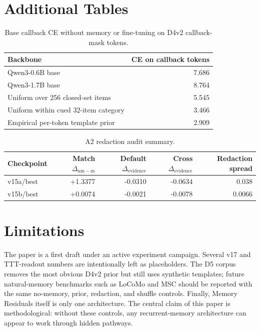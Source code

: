 \documentclass{article}
\newcommand{\dnm}{\Delta_{\mathrm{nm-m}}}
\newcommand{\elift}{\Delta_{\mathrm{evidence}}}
\begin{document}
\section{Additional Tables}

\begin{table}[h]
\centering
\caption{Base callback CE without memory or fine-tuning on D4v2
callback-mask tokens.}
\label{tab:base_ce}
\small
\begin{tabular}{lr}
\toprule
Backbone & CE on callback tokens \\
\midrule
Qwen3-0.6B base & 7.686 \\
Qwen3-1.7B base & 8.764 \\
Uniform over 256 closed-set items & 5.545 \\
Uniform within cued 32-item category & 3.466 \\
Empirical per-token template prior & 2.909 \\
\bottomrule
\end{tabular}
\end{table}

\begin{table}[h]
\centering
\caption{A2 redaction audit summary.}
\label{tab:redaction_summary}
\small
\begin{tabular}{lrrrr}
\toprule
Checkpoint & Match $\dnm$ & Default $\elift$ & Cross $\elift$ & Redaction spread \\
\midrule
v15a/best & +1.3377 & -0.0310 & -0.0634 & 0.038 \\
v15b/best & +0.0074 & -0.0021 & -0.0078 & 0.0066 \\
\bottomrule
\end{tabular}
\end{table}

\section{Limitations}

The paper is a first draft under an active experiment campaign.  Several
v17 and TTT-readout numbers are intentionally left as placeholders.  The
D5 corpus removes the most obvious D4v2 prior but still uses synthetic
templates; future natural-memory benchmarks such as LoCoMo and MSC
should be reported with the same no-memory, prior, redaction, and
shuffle controls.  Finally, Memory Residuals itself is only one
architecture.  The central claim of this paper is methodological:
without these controls, any recurrent-memory architecture can appear to
work through hidden pathways.
\end{document}
